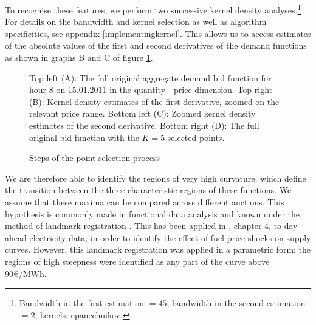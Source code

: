 To recognise these features, we perform two successive kernel density analyses.\footnote{Bandwidth in the first estimation $=45$, bandwidth in the second estimation $=2$, kernels: epanechnikov.}
For details on the bandwidth and kernel selection as well as algorithm specificities, see appendix \ref{implementingkernel}. This allows us to access estimates of the absolute values of the first and second derivatives of the demand functions as shown in graphs B and C of figure \ref{selectedpoints}.\\ 
\begin{figure}[!ht]
\begin{center}
\caption{Steps of the point selection process}
\label{selectedpoints}
\end{center}
{\small Top left (A): The full original aggregate demand bid function for hour 8 on 15.01.2011 in the quantity - price dimension. Top right (B): Kernel density estimates of the first derivative, zoomed on the relevant price range. Bottom left (C): Zoomed kernel density estimates of the second derivative. Bottom right (D): The full original bid function with the $K=5$ selected points. 
}
\end{figure}

We are therefore able to identify the regions of very high curvature, which define the transition between the three characteristic regions of these functions. We assume that these maxima can be compared across different auctions. This hypothesis is commonly made in functional data analysis and known under the method of landmark registration \cite{ramsaysilverman2005functional}. This has been applied in \cite{wolfi2013interacting}, chapter 4, to day-ahead electricity data, in order to identify the effect of fuel price shocks on supply curves. However, this landmark registration was applied in a parametric form: the regions of high steepness were identified as any part of the curve above 90€/MWh. \\

